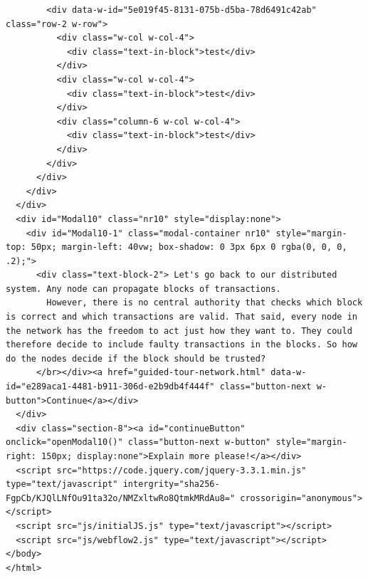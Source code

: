 \begin{lstlisting}
        <div data-w-id="5e019f45-8131-075b-d5ba-78d6491c42ab" class="row-2 w-row">
          <div class="w-col w-col-4">
            <div class="text-in-block">test</div>
          </div>
          <div class="w-col w-col-4">
            <div class="text-in-block">test</div>
          </div>
          <div class="column-6 w-col w-col-4">
            <div class="text-in-block">test</div>
          </div>
        </div>
      </div>
    </div>
  </div>
  <div id="Modal10" class="nr10" style="display:none">
    <div id="Modal10-1" class="modal-container nr10" style="margin-top: 50px; margin-left: 40vw; box-shadow: 0 3px 6px 0 rgba(0, 0, 0, .2);">
      <div class="text-block-2"> Let's go back to our distributed system. Any node can propagate blocks of transactions.
        However, there is no central authority that checks which block is correct and which transactions are valid. That said, every node in the network has the freedom to act just how they want to. They could therefore decide to include faulty transactions in the blocks. So how do the nodes decide if the block should be trusted?
      </br></div><a href="guided-tour-network.html" data-w-id="e289aca1-4481-b911-306d-e2b9db4f444f" class="button-next w-button">Continue</a></div>
  </div>
  <div class="section-8"><a id="continueButton" onclick="openModal10()" class="button-next w-button" style="margin-right: 150px; display:none">Explain more please!</a></div>
  <script src="https://code.jquery.com/jquery-3.3.1.min.js" type="text/javascript" intergrity="sha256-FgpCb/KJQlLNfOu91ta32o/NMZxltwRo8QtmkMRdAu8=" crossorigin="anonymous"></script>
  <script src="js/initialJS.js" type="text/javascript"></script>
  <script src="js/webflow2.js" type="text/javascript"></script>
</body>
</html>
\end{lstlisting}


